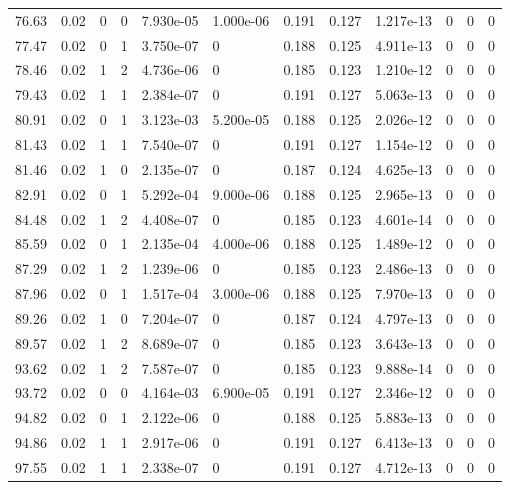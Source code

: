 \documentclass[preview]{standalone}
\begin{document}
{{{\begin{tabular}{L{1.2cm}C{1.2cm} C{0.3cm}C{0.5cm} C{1.4cm}C{1.4cm} C{1.4cm}C{1.4cm} C{1.6cm}C{1.6cm} C{1.6cm}C{1.6cm}}
  76.63  &  0.02  & 0     &  0 &  7.930e-05  & 1.000e-06  &  0.191&   0.127& 1.217e-13 & 0   &  0 & 0  \\ 
  77.47  &  0.02  & 0     &  1 &  3.750e-07  & 0  &  0.188&   0.125& 4.911e-13 & 0   &  0 & 0  \\ 
  78.46  &  0.02  & 1     &  2 &  4.736e-06  & 0  &  0.185&   0.123& 1.210e-12 & 0   &  0 & 0  \\ 
  79.43  &  0.02  & 1     &  1 &  2.384e-07  & 0  &  0.191&   0.127& 5.063e-13 & 0   &  0 & 0  \\ 
  80.91  &  0.02  & 0     &  1 &  3.123e-03  & 5.200e-05  &  0.188&   0.125& 2.026e-12 & 0   &  0 & 0  \\ 
  81.43  &  0.02  & 1     &  1 &  7.540e-07  & 0  &  0.191&   0.127& 1.154e-12 & 0   &  0 & 0  \\ 
  81.46  &  0.02  & 1     &  0 &  2.135e-07  & 0  &  0.187&   0.124& 4.625e-13 & 0   &  0 & 0  \\ 
  82.91  &  0.02  & 0     &  1 &  5.292e-04  & 9.000e-06  &  0.188&   0.125& 2.965e-13 & 0   &  0 & 0  \\ 
  84.48  &  0.02  & 1     &  2 &  4.408e-07  & 0  &  0.185&   0.123& 4.601e-14 & 0   &  0 & 0  \\ 
  85.59  &  0.02  & 0     &  1 &  2.135e-04  & 4.000e-06  &  0.188&   0.125& 1.489e-12 & 0   &  0 & 0  \\ 
  87.29  &  0.02  & 1     &  2 &  1.239e-06  & 0  &  0.185&   0.123& 2.486e-13 & 0   &  0 & 0  \\ 
  87.96  &  0.02  & 0     &  1 &  1.517e-04  & 3.000e-06  &  0.188&   0.125& 7.970e-13 & 0   &  0 & 0  \\ 
  89.26  &  0.02  & 1     &  0 &  7.204e-07  & 0  &  0.187&   0.124& 4.797e-13 & 0   &  0 & 0  \\ 
  89.57  &  0.02  & 1     &  2 &  8.689e-07  & 0  &  0.185&   0.123& 3.643e-13 & 0   &  0 & 0  \\ 
  93.62  &  0.02  & 1     &  2 &  7.587e-07  & 0  &  0.185&   0.123& 9.888e-14 & 0   &  0 & 0  \\ 
  93.72  &  0.02  & 0     &  0 &  4.164e-03  & 6.900e-05  &  0.191&   0.127& 2.346e-12 & 0   &  0 & 0  \\ 
  94.82  &  0.02  & 0     &  1 &  2.122e-06  & 0  &  0.188&   0.125& 5.883e-13 & 0   &  0 & 0  \\ 
  94.86  &  0.02  & 1     &  1 &  2.917e-06  & 0  &  0.191&   0.127& 6.413e-13 & 0   &  0 & 0  \\ 
  97.55  &  0.02  & 1     &  1 &  2.338e-07  & 0  &  0.191&   0.127& 4.712e-13 & 0   &  0 & 0  \\ 

\end{tabular}}}}
\end{document}
